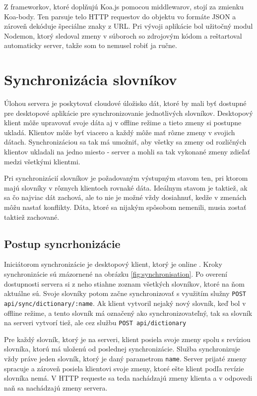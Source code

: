 \documentclass[
  digital, %
  table,   %
  lof,     %
  lot,     %
]{fithesis3}
\begin{document}
Z frameworkov, ktoré doplňujú Koa.js pomocou middlewarov, stojí za zmienku Koa-body. Ten parsuje telo HTTP requestov do objektu vo formáte JSON a zároveň dekóduje špeciálne znaky z URL. Pri vývoji aplikácie bol užitočný modul Nodemon, ktorý sledoval zmeny v súboroch so zdrojovým kódom a reštartoval automaticky server, takže som to nemusel robiť ja ručne. 


\section{Synchronizácia slovníkov}
Úlohou servera je poskytovať cloudové úložisko dát, ktoré by mali byť dostupné pre desktopové aplikácie pre synchronizovanie jednotlivých slovníkov. Desktopový klient môže upravovať svoje dáta aj v offline režime a tieto zmeny si postupne ukladá. Klientov môže byť viacero a každý môže mať rôzne zmeny v svojich dátach. Synchronizáciou sa tak má umožniť, aby všetky sa zmeny od rozličných klientov ukladali na jedno miesto - server a mohli sa tak vykonané zmeny zdieľať medzi všetkými klientmi.

Pri synchronizácií slovníkov je požadovaným výstupným stavom ten, pri ktorom majú slovníky v rôznych klientoch rovnaké dáta. Ideálnym stavom je taktiež, ak sa čo najviac dát zachová, ale to nie je možné vždy dosiahnuť, kedže v zmenách môžu nastať konflikty. Dáta, ktoré sa nijakým spôsobom nemenili, musia zostať taktiež zachované.

\subsection{Postup syncrhonizácie}
Iniciátorom synchronizácie je desktopový klient, ktorý je online . Kroky synchronizácie sú znázornené na obrázku \ref{fig:synchronisation}. Po overení dostupnosti servera si z neho stiahne zoznam všetkých slovníkov, ktoré na ňom aktuálne sú. Svoje slovníky potom začne synchronizovať s využitím služny \texttt{POST api/sync/dictionary/:name}. Ak klient vytvoril nejaký nový slovník, keď bol v offline režime, a tento slovník má označený ako synchronizovateľný, tak sa slovník na serveri vytvorí tiež, ale cez službu \texttt{POST api/dictionary}

Pre každý slovník, ktorý je na serveri, klient posiela svoje zmeny spolu s revíziou slovníka, ktorú má uloženú od poslednej synchronizácie. Služba synchronizuje vždy práve jeden slovník, ktorý je daný parametrom \texttt{name}. Server prijaté zmeny spracuje a zároveň posiela klientovi svoje zmeny, ktoré ešte klient podľa revízie slovníka nemá. V HTTP requeste sa teda nachádzajú zmeny klienta a v odpovedi naň sa nachádzajú zmeny servera.
\end{document}
